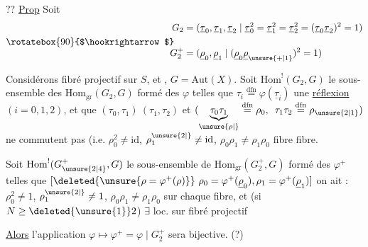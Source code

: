 ?? \uline{Prop} Soit
\[
\begin{aligned}
G_2&=(\underline{\tau}_0,\underline{\tau}_1,\underline{\tau}_2\mid
\underline{\tau}_0^2=\underline{\tau}_1^2=\underline{\tau}_2^2=(\underline{\tau}_0\underline{\tau}_2)^2=1)\\
\rotatebox{90}{$\hookrightarrow$}\quad &\\[-1ex]
G_2^+&=(\underline{\rho}_0,\underline{\rho}_1\mid(\underline{\rho}_0\underline{\rho}_{\unsure{+|1}})^2=1)
\end{aligned}
\]

Considérons fibré projectif  sur $S$,  et , $G=\mathrm{Aut}(X)$.  Soit $\mathrm{Hom}^!(G_2,G)$ le sous-ensemble des $\mathrm{Hom}_{\mathrm{gr}}(G_2,G)$ formé des $\varphi$ telles que $\tau_i\overset{\mathrm{dfn}}{=}\varphi(\underline{\tau}_i)$  une \uline{réflexion} $(i=0,1,2)$, et que $(\tau_0,\tau_1)\ (\tau_1,\tau_2)$ et $(\underbrace{\tau_0\tau_1}_{\unsure{\rho|{}}}\overset{\mathrm{dfn}}{=}\rho_0,\enspace \tau_1\tau_2\overset{\mathrm{dfn}}{=}\rho_{\unsure{2|1}})$ ne commutent pas  (i.e. $\rho_0^2\ne\mathrm{id}$, $\rho_1^{\unsure{2|{}}}\ne\mathrm{id}$, $\rho_0\rho_1\ne\rho_1\rho_0$ fibre  fibre.


Soit $\mathrm{Hom}^!(G_{\unsure{2|4}}^+,G)$ le sous-ensemble de $\mathrm{Hom}_{\mathrm{gr}}(G_2^+,G)$ formé des $\varphi^+$ telles que $[\deleted{\unsure{\rho=\varphi^+(\rho)}}\ \rho_0=\varphi^+(\underline{\rho}_0),\rho_1=\varphi^+(\underline{\rho}_1)]$ on ait : $\rho_0^2\ne1$, $\rho_1^{\unsure{2|{}}}\ne1$, $\rho_0\rho_1\ne\rho_1\rho_0$ sur chaque fibre, et (si $N\geq\deleted{\unsure{1}}2$) $\exists$ loc. sur  fibré projectif  

\uline{Alors} l'application $\varphi\longmapsto\varphi^+=\varphi\mid G_2^+$ sera bijective. (?)

